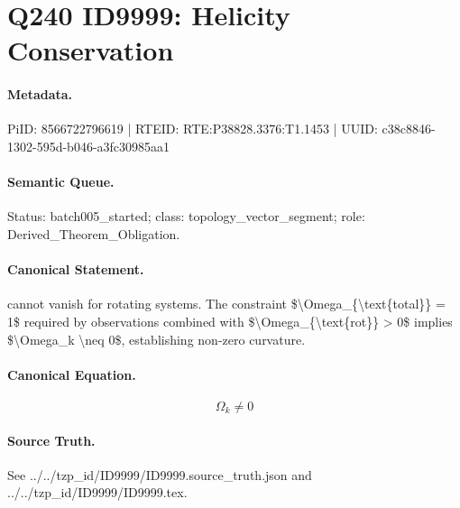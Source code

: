 \section*{Q240 ID9999: Helicity Conservation}
\paragraph{Metadata.}
PiID: 8566722796619 | RTEID: RTE:P38828.3376:T1.1453 | UUID: c38c8846-1302-595d-b046-a3fc30985aa1

\paragraph{Semantic Queue.}
Status: batch005\_started; class: topology\_vector\_segment; role: Derived\_Theorem\_Obligation.

\paragraph{Canonical Statement.}
cannot vanish for rotating systems. The constraint \$\textbackslash{}Omega\_\{\textbackslash{}text\{total\}\} = 1\$ required by observations combined with \$\textbackslash{}Omega\_\{\textbackslash{}text\{rot\}\} > 0\$ implies \$\textbackslash{}Omega\_k \textbackslash{}neq 0\$, establishing non-zero curvature.

\paragraph{Canonical Equation.}
\[
\Omega_k \neq 0
\]

\paragraph{Source Truth.}
See ../../tzp\_id/ID9999/ID9999.source\_truth.json and ../../tzp\_id/ID9999/ID9999.tex.
